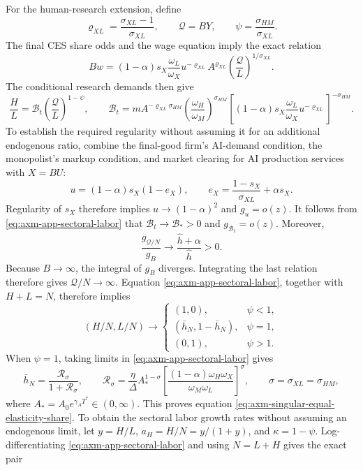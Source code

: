 For the human-research extension, define
\[
 \varrho_{XL}=\frac{\sigma_{XL}-1}{\sigma_{XL}},\qquad
 \mathcal Q=BY,\qquad
 \psi=\frac{\sigma_{HM}}{\sigma_{XL}}.
\]
The final CES share odds and the wage equation imply the exact relation
\[
 Bw=(1-\alpha)s_X\frac{\omega_L}{\omega_X}
 u^{-\varrho_{XL}}
 A^{\varrho_{XL}}
 \left(\frac{\mathcal Q}{L}\right)^{1/\sigma_{XL}}.
\]
The conditional research demands then give
\begin{equation}
 \frac{H}{L}=\mathcal B_t
 \left(\frac{\mathcal Q}{L}\right)^{1-\psi},
 \qquad
 \mathcal B_t=mA^{-\varrho_{XL}\sigma_{HM}}
 \left(\frac{\omega_H}{\omega_M}\right)^{\sigma_{HM}}
 \left[(1-\alpha)s_X\frac{\omega_L}{\omega_X}
 u^{-\varrho_{XL}}\right]^{-\sigma_{HM}}.
 \label{eq:axm-app-sectoral-labor}
\end{equation}
To establish the required regularity without assuming it for an additional
endogenous ratio, combine the final-good firm's AI-demand condition, the
monopolist's markup condition, and market clearing for AI production services with \(X=BU\):
\[
 u=(1-\alpha)s_X(1-e_X),\qquad
 e_X=\frac{1-s_X}{\sigma_{XL}}+\alpha s_X.
\]
Regularity of \(s_X\) therefore implies
\(u\to(1-\alpha)^2\) and \(g_u=o(z)\). It follows from
\eqref{eq:axm-app-sectoral-labor} that \(\mathcal B_t\to\mathcal B_*>0\) and
\(g_{\mathcal B_t}=o(z)\). Moreover,
\[
 \frac{g_{\mathcal Q/N}}{g_B}
 \to\frac{\widehat h+\alpha}{\widehat h}>0.
\]
Because \(B\to\infty\), the integral of \(g_B\) diverges. Integrating the last
relation therefore gives \(\mathcal Q/N\to\infty\).
Equation \eqref{eq:axm-app-sectoral-labor}, together with \(H+L=N\), therefore
implies
\[
 (H/N,L/N)\to
 \begin{cases}
  (1,0),&\psi<1,\\
  (\bar h_N,1-\bar h_N),&\psi=1,\\
  (0,1),&\psi>1.
 \end{cases}
\]
When \(\psi=1\), taking limits in
\eqref{eq:axm-app-sectoral-labor} gives
\[
 \bar h_N=\frac{\mathcal R_\sigma}{1+\mathcal R_\sigma},\qquad
 \mathcal R_\sigma=\frac{\eta}{\Delta}A_*^{1-\sigma}
 \left[
  \frac{(1-\alpha)\omega_H\omega_X}{\omega_M\omega_L}
 \right]^{\sigma},\qquad
 \sigma=\sigma_{XL}=\sigma_{HM},
\]
where \(A_*=A_0e^{\gamma_AT^*}\in(0,\infty)\). This proves equation
\eqref{eq:axm-singular-equal-elasticity-share}.
To obtain the sectoral labor growth rates without assuming an endogenous limit,
let \(y=H/L\), \(a_H=H/N=y/(1+y)\), and
\(\kappa=1-\psi\). Log-differentiating
\eqref{eq:axm-app-sectoral-labor} and using \(N=L+H\) gives the exact pair
